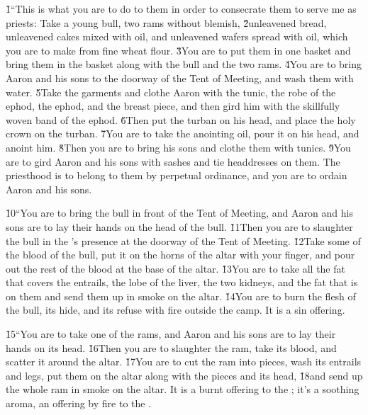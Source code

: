 \v{1}``This is what you are to do to them in order to consecrate them to serve me as priests: Take a young bull, two rams without blemish, \v{2}unleavened bread, unleavened cakes mixed with oil, and unleavened wafers spread with oil, which you are to make from fine wheat flour. \v{3}You are to put them in one basket and bring them in the basket along with the bull and the two rams. \v{4}You are to bring Aaron and his sons to the doorway of the Tent of Meeting, and wash them with water. \v{5}Take the garments and clothe Aaron with the tunic, the robe of the ephod, the ephod, and the breast piece, and then gird him with the skillfully woven band of the ephod. \v{6}Then put the turban on his head, and place the holy crown on the turban. \v{7}You are to take the anointing oil, pour it on his head, and anoint him. \v{8}Then you are to bring his sons and clothe them with tunics. \v{9}You are to gird Aaron and his sons with sashes and tie headdresses on them. The priesthood is to belong to them by perpetual ordinance, and you are to ordain Aaron and his sons.

\v{10}``You are to bring the bull in front of the Tent of Meeting, and Aaron and his sons are to lay their hands on the head of the bull. \v{11}Then you are to slaughter the bull in the 's presence at the doorway of the Tent of Meeting. \v{12}Take some of the blood of the bull, put it on the horns of the altar with your finger, and pour out the rest of the blood at the base of the altar. \v{13}You are to take all the fat that covers the entrails, the lobe of the liver, the two kidneys, and the fat that is on them and send them up in smoke on the altar. \v{14}You are to burn the flesh of the bull, its hide, and its refuse with fire outside the camp. It is a sin offering.

\v{15}``You are to take one of the rams, and Aaron and his sons are to lay their hands on its head. \v{16}Then you are to slaughter the ram, take its blood, and scatter it around the altar. \v{17}You are to cut the ram into pieces, wash its entrails and legs, put them on the altar along with the pieces and its head, \v{18}and send up the whole ram in smoke on the altar. It is a burnt offering to the ; it's a soothing aroma, an offering by fire to the .

